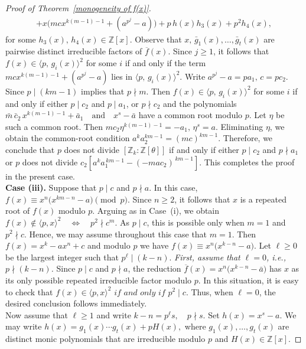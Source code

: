 \documentclass[table]{amsart}
\newcommand{\Z}{\mathbb{Z}}
\numberwithin{equation}{section}
\begin{document}
\begin{proof}[Proof of Theorem~\ref{monogeneity of f(x)}]
\begin{align*}
   + x\bigl(m c x^{k(m-1)-1} + (a^{p^{j}}-a)\bigr)
   + p\,h(x)h_{3}(x) + p^{2}h_{4}(x),
\end{align*}
for some $h_{3}(x),\,h_{4}(x)\in\mathbb{Z}[x]$. Observe that $x,\,\bar g_{1}(x),\ldots,\bar g_{t}(x)$ are pairwise distinct irreducible factors of $\overline{f}(x)$.
Since $j\ge1$, it follows that $f(x)\in\langle p,\, g_i(x)\rangle^{2}$
for some $i$ if and only if the term $m c x^{k(m-1)-1} + (a^{p^{j}}-a)$ lies in $\langle p,\, g_i(x)\rangle^{2}$. Write $a^{p^{j}}-a=pa_{1},\,c=pc_{2}.$ Since $p\mid (km-1)$ implies that $p\nmid m$. Then $f(x)\in\langle p,\, g_i(x)\rangle^{2}$ for some $i$ if and only if either $p\mid c_{2}$ and $p\mid a_{1}$, or $p\nmid c_{2}$ and the polynomials $\bar m\,\bar c_{2}\,x^{k(m-1)-1}+\bar a_{1}
\quad\text{and}\quad
x^{s}-\bar a$ have a common root modulo $p$. Let $\eta$ be such a common root. Then $m c_{2}\eta^{k(m-1)-1}=-a_{1},
\,
\eta^{s}=a.$ Eliminating $\eta$, we obtain the common-root condition $a^ka_2^{km-1}=(mc)^{km-1}.$ Therefore, we conclude that $p$ does not divide $[\Z_k :\Z[\theta]]$ if and only if either $p\mid c_2$ and $p\nmid a_1$ or $p$ does not divide $c_2[a^ka_1^{\,km-1}-(-mac_2)^{\,km-1}]$. This completes the proof in the present case. \\[2mm]
\textbf{Case (iii).} Suppose that $p\mid c$ and $p\nmid a$. In this case,
$f(x)\equiv x^{n}\bigl(x^{km-n}-a\bigr)\pmod{p}.$ Since $n\ge2$, it follows that $x$ is a repeated root of $f(x)$ modulo $p$. Arguing as in Case~(i), we obtain $f(x)\notin\langle p,x\rangle^2
\quad \Longleftrightarrow \quad
p^{2}\nmid c^{m}.$ As $p\mid c$, this is possible only when $m=1$ and $p^{2}\nmid c$. Hence, we may assume throughout this case that $m=1$. Then $f(x)=x^{k}-ax^{n}+c$ and modulo $p$ we have $f(x)\equiv x^{n}\bigl(x^{k-n}-a\bigr).$ Let $\ell\ge0$ be the largest integer such that $p^{\ell}\mid(k-n)$.
\medskip
\emph{First, assume that $\ell=0$, i.e., \ $p\nmid(k-n)$.}
Since $p\mid c$ and $p\nmid a$, the reduction $\overline{f}(x)=x^{n}\bigl(x^{k-n}-\bar a\bigr)$ has $x$ as its only possible repeated irreducible factor modulo $p$. In this situation, it is easy to check that $f(x)\in\langle p,x\rangle^{2}
\textit{ if and only if }
p^{2}\mid c.$ Thus, when $\ell=0$, the desired conclusion follows immediately.\\
Now assume that $\ell\ge1$ and write $k-n=p^{\ell}s,
\quad p\nmid s.$ Set $h(x)=x^{s}-a.$ We may write $h(x)=g_{1}(x)\cdots g_{t}(x)+pH(x),$ where $g_{1}(x),\dots,g_{t}(x)$ are distinct monic polynomials that are irreducible modulo $p$ and $H(x)\in\mathbb{Z}[x]$.

\end{proof}
\end{document}
